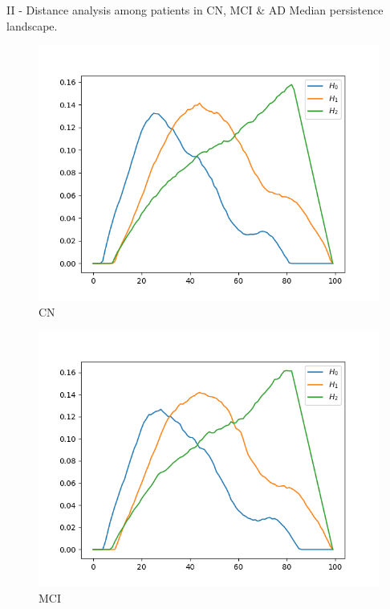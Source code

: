 \documentclass[aspectratio=169, 10pt, dvipsnames]{beamer}
\begin{document}
\begin{frame}[fragile]{II - Distance analysis among patients in CN, MCI \& AD}
  Median persistence landscape.\\
  \begin{figure}
    \centering
    \includegraphics[width=\textwidth]{figures/median_pls/median_pl_CN.png}
    \caption{CN}
  \end{figure}
  \endminipage
  \hfill
  \begin{figure}
    \centering
    \includegraphics[width=\textwidth]{figures/median_pls/median_pl_MCI.png}
    \caption{MCI}
  \end{figure}
  \endminipage
  \hfill

\end{frame}
\end{document}
